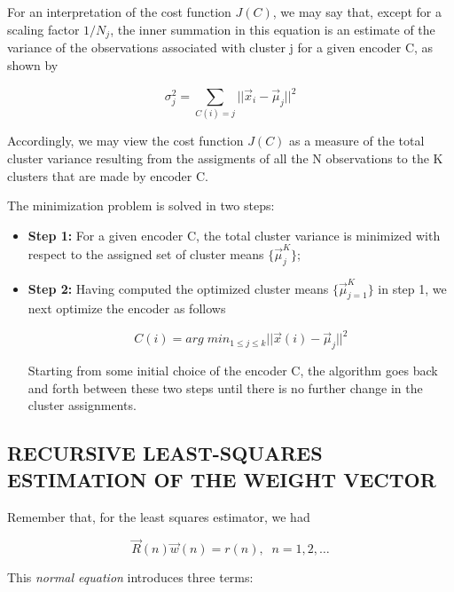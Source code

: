 \documentclass{article}
\begin{document}
For an interpretation of the cost function $ J (C) $, we may say that, except for a scaling factor $ 1 / N_{j} $, the inner summation in this equation is an estimate of the variance of the observations associated with cluster j for a given encoder C, as shown by

$$ \sigma_{j}^{2} = \displaystyle\sum_{C (i) = j}^{} || \vec{x}_{i} - \vec{\mu}_{j}||^{2} $$

Accordingly, we may view the cost function $ J (C) $ as a measure of the total cluster variance resulting from the assigments of all the N observations to the K clusters that are made by encoder C.

The minimization problem is solved in two steps:

\begin{itemize}
\item \textbf{Step 1:} For a given encoder C, the total cluster variance is minimized with respect to the assigned set of cluster means $ \{ \vec{\mu}_{j}^{K} \} $;
\item \textbf{Step 2:} Having computed the optimized cluster means $ \{ \vec{\mu}_{j = 1}^{K} \} $ in step 1, we next optimize the encoder as follows

	$$ C (i) = arg \; min_{1 \leq j \leq k} || \vec{x} (i) - \vec{\mu}_{j}||^{2} $$

Starting from some initial choice of the encoder C, the algorithm goes back and forth between these two steps until there is no further change in the cluster assignments.
\end{itemize}

\subsection{RECURSIVE LEAST-SQUARES ESTIMATION OF THE WEIGHT VECTOR}

Remember that, for the least squares estimator, we had

$$ \vec{R} (n) \vec{w} (n) = r (n), \;\; n = 1, 2, \ldots $$

This \textit{normal equation} introduces three terms:
\end{document}
